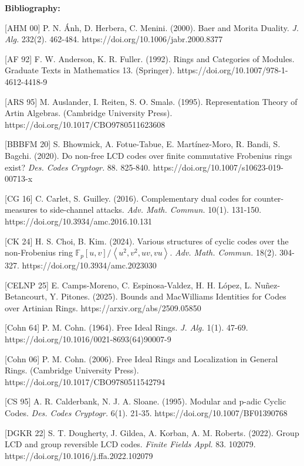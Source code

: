 \documentclass{article}
\theoremstyle{plain}
\theoremstyle{plain}
\theoremstyle{remark}
\theoremstyle{plain}
\begin{document}
\medskip

\noindent \textbf{Bibliography:}

[AHM 00] P. N. Ánh, D. Herbera, C. Menini. (2000). Baer and Morita Duality. \textit{J. Alg.} 232(2).  462-484. https://doi.org/10.1006/jabr.2000.8377


[AF 92] F. W. Anderson, K. R. Fuller. (1992). Rings and Categories of Modules. Graduate Texts in Mathematics 13. (Springer). https://doi.org/10.1007/978-1-4612-4418-9

[ARS 95] M. Auslander, I. Reiten, S. O. Smal\o. (1995). Representation Theory of Artin Algebras. (Cambridge University Press).
https://doi.org/10.1017/CBO9780511623608

[BBBFM 20] S. Bhowmick, A. Fotue-Tabue, E. Martínez-Moro, R. Bandi, S. Bagchi. (2020). Do non-free LCD codes over finite commutative Frobenius rings exist? \textit{Des. Codes Cryptogr.} 88. 825-840. https://doi.org/10.1007/s10623-019-00713-x

[CG 16] C. Carlet, S. Guilley. (2016). Complementary dual codes for counter-measures to side-channel attacks. \textit{Adv. Math. Commun.} 10(1). 131-150. https://doi.org/10.3934/amc.2016.10.131

[CK 24] H. S. Choi, B. Kim. (2024). Various structures of cyclic codes over the non-Frobenius ring $\mathbb{F}_p[u, v] /\left\langle u^2, v^2, u v, v u\right\rangle$. \textit{Adv. Math. Commun.} 18(2). 304-327. https://doi.org/10.3934/amc.2023030



[CELNP 25] E. Camps-Moreno, C. Espinosa-Valdez, H. H. López, L. Nuñez-Betancourt, Y. Pitones. (2025). Bounds and MacWilliams Identities for Codes over Artinian Rings. https://arxiv.org/abs/2509.05850

[Cohn 64] P. M. Cohn. (1964). Free Ideal Rings. \textit{J. Alg.} 1(1). 47-69. https://doi.org/10.1016/0021-8693(64)90007-9


[Cohn 06] P. M. Cohn. (2006). Free Ideal Rings and Localization in General Rings. (Cambridge University Press). https://doi.org/10.1017/CBO9780511542794


[CS 95] A. R. Calderbank, N. J. A. Sloane. (1995). Modular and p-adic Cyclic Codes. \textit{Des. Codes Cryptogr.} 6(1). 21-35. https://doi.org/10.1007/BF01390768 


[DGKR 22] S. T. Dougherty, J. Gildea, A. Korban, A. M. Roberts. (2022). Group LCD and group reversible LCD codes. \textit{Finite Fields Appl.} 83. 102079. https://doi.org/10.1016/j.ffa.2022.102079
\end{document}
